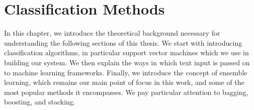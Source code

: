 \chapter{Classification Methods}
\label{chapter:Classification Methods}

In this chapter, we introduce the theoretical background necessary for understanding the following sections of this thesis. We start with introducing classification algorithms, in particular support vector machines which we use in building our system. We then explain the ways in which text input is passed on to machine learning frameworks. Finally, we introduce the concept of ensemble learning, which remains our main point of focus in this work, and some of the most popular methods it encompasses. We pay particular attention to bagging, boosting, and stacking.

